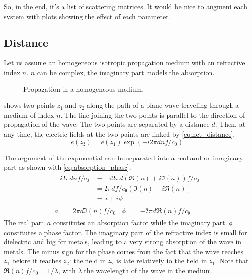 So, in the end, it's a list of scattering matrices.  It would be nice to augment each system with plots showing the effect of each parameter.




\subsection{Distance}
\label{sec:generic_networks_distance}
Let us assume an homogeneous isotropic propagation medium with an refractive index $n$.
$n$ can be complex, the imaginary part models the absorption.

\begin{figure}[hbtp]
    \centering
    \caption{\label{fig:net_distance} Propagation in a homogeneous medium.}
\end{figure}
 shows two points $z_1$ and $z_2$ along the path of a plane wave traveling through a medium of index $n$.
The line joining the two points is parallel to the direction of propagation of the wave.
The two points are separated by a distance $d$.
Then, at any time, the electric fields at the two points are linked by \cref{eq:net_distance}.
\begin{equation}
    e(z_2) = e(z_1) \exp
    \left(
        - i 2\pi d n f / c_0
    \right)
    \label{eq:net_distance}
\end{equation}

The argument of the exponential can be separated into a real and an imaginary part as shown with \cref{eq:absorption_phase}.
\begin{gather}
    \begin{aligned}
        - i 2\pi d n f / c_0
        &= - i 2\pi d \left(\Re(n) + i\Im(n)\right) f / c_0 \\
        &= 2\pi d f / c_0 \left(\Im(n) - i\Re(n) \right) \\
        &= a + i \phi
    \end{aligned}
    \label{eq:absorption_phase}
    \\
    \begin{aligned}
        a &= 2\pi d \Im(n) f / c_0   &   \phi &= -2\pi d \Re(n) f / c_0
    \end{aligned}
\end{gather}
The real part~$a$ constitutes an absorption factor while the imaginary part~$\phi$ constitutes a phase factor.
The imaginary part of the refractive index is small for dielectric and big for metals,
leading to a very strong absorption of the wave in metals.
The minus sign for the phase comes from the fact that the wave reaches $z_1$ before it reaches $z_2$: the field in $z_2$ is late relatively to the field in $z_1$.
Note that $\Re(n) f / c_0 = 1 / \lambda$, with $\lambda$ the wavelength of the wave in the medium.

